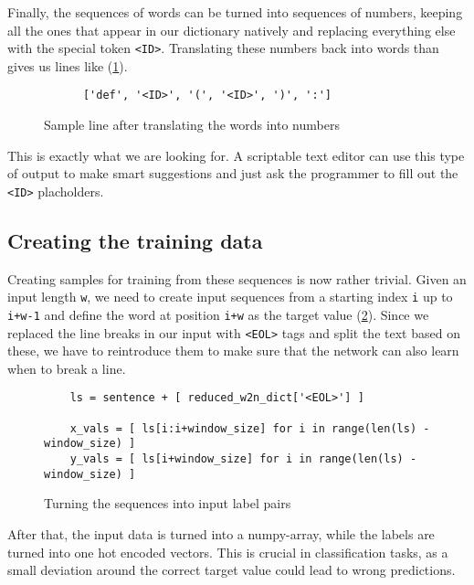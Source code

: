     Finally, the sequences of words can be turned into sequences of numbers, keeping all the ones that appear in
    our dictionary natively and replacing everything else with the special token \verb+<ID>+. Translating
    these numbers back into words than gives us lines like (\ref{fig:goodsample}).

    \begin{figure}[htpb]
      \centering
      \begin{verbatim}
      ['def', '<ID>', '(', '<ID>', ')', ':'] \end{verbatim}
      \caption{Sample line after translating the words into numbers}
      \label{fig:goodsample}
    \end{figure}

    This is exactly what we are looking for. A scriptable text editor
    can use this type of output to make smart suggestions and just ask the programmer to fill out the \verb+<ID>+ placholders.

    \subsection{Creating the training data}
    \label{sub:creating_the_training_data}
    
      Creating samples for training from these sequences is now rather trivial. Given an input length \verb+w+, we need
      to create input sequences from a starting index \verb+i+ up to \verb|i+w-1| and define the word at position
      \verb|i+w| as the target value (\ref{fig:tosamples}). Since we replaced the line breaks in our input with
      \verb+<EOL>+ tags and split the text based on these, we have to reintroduce them to make sure that
      the network can also learn when to break a line.

      \begin{figure}[htpb]
        \centering
        \begin{lstlisting}
    ls = sentence + [ reduced_w2n_dict['<EOL>'] ]
    
    x_vals = [ ls[i:i+window_size] for i in range(len(ls) - window_size) ]
    y_vals = [ ls[i+window_size] for i in range(len(ls) - window_size) ] \end{lstlisting}
        \caption{Turning the sequences into input label pairs}
        \label{fig:tosamples}
      \end{figure}

      After that, the input data is turned into a numpy-array, while the labels are turned into one hot encoded vectors.
      This is crucial in classification tasks, as a small deviation around the correct target value could lead to
      wrong predictions.
